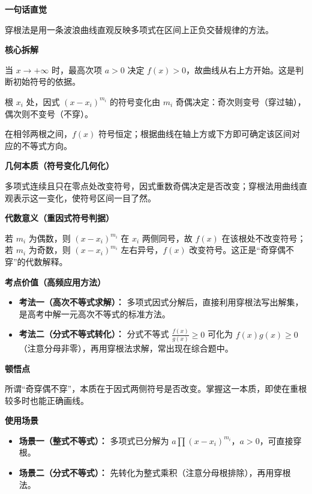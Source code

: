 \begin{explanationbox}

	\textbf{\textcolor{CExplanation}{一句话直觉}}

	穿根法是用一条波浪曲线直观反映多项式在区间上正负交替规律的方法。

	\medskip
	\textbf{\textcolor{CExplanation}{核心拆解}}
	\begin{description}[style=nextline, leftmargin=2.8em, labelsep=0.5em, itemsep=0.45em]
		\item[\textbf{要点一（右端起笔）：}] 当 $x\to+\infty$ 时，最高次项 $a>0$ 决定 $f(x)>0$，故曲线从右上方开始。这是判断初始符号的依据。
		\item[\textbf{要点二（奇穿偶不穿）：}] 根 $x_i$ 处，因式 $(x-x_i)^{m_i}$ 的符号变化由 $m_i$ 奇偶决定：奇次则变号（穿过轴），偶次则不变号（不穿）。
		\item[\textbf{要点三（区间判号）：}] 在相邻两根之间，$f(x)$ 符号恒定；根据曲线在轴上方或下方即可确定该区间对应的不等式方向。
	\end{description}

	\medskip
	\textbf{\textcolor{CExplanation}{几何本质（符号变化几何化）}}

	多项式连续且只在零点处改变符号，因式重数奇偶决定是否改变；穿根法用曲线直观表示这一变化，使符号区间一目了然。

	\medskip
	\textbf{\textcolor{CExplanation}{代数意义（重因式符号判据）}}

	若 $m_i$ 为偶数，则 $(x-x_i)^{m_i}$ 在 $x_i$ 两侧同号，故 $f(x)$ 在该根处不改变符号；若 $m_i$ 为奇数，则 $(x-x_i)^{m_i}$ 左右异号，$f(x)$ 改变符号。这正是“奇穿偶不穿”的代数解释。

	\medskip
	\textbf{\textcolor{CExplanation}{考点价值（高频应用方法）}}
	\begin{itemize}[leftmargin=*, itemsep=0.5em, topsep=0.4em]
		\item \textbf{考法一（高次不等式求解）：} 多项式因式分解后，直接利用穿根法写出解集，是高考中解一元高次不等式的标准方法。
		\item \textbf{考法二（分式不等式转化）：} 分式不等式 $\frac{f(x)}{g(x)}\geq0$ 可化为 $f(x)g(x)\geq0$（注意分母非零），再用穿根法求解，常出现在综合题中。
	\end{itemize}

	\medskip
	\textbf{\textcolor{CExplanation}{顿悟点}}

	所谓“奇穿偶不穿”，本质在于因式两侧符号是否改变。掌握这一本质，即使在重根较多时也能正确画线。

	\medskip
	\textbf{\textcolor{CExplanation}{使用场景}}
	\begin{itemize}[leftmargin=*, itemsep=0.5em, topsep=0.4em]
		\item \textbf{场景一（整式不等式）：} 多项式已分解为 $a\prod (x-x_i)^{m_i}$，$a>0$，可直接穿根。
		\item \textbf{场景二（分式不等式）：} 先转化为整式乘积（注意分母根排除），再用穿根法。
	\end{itemize}
\end{explanationbox}
